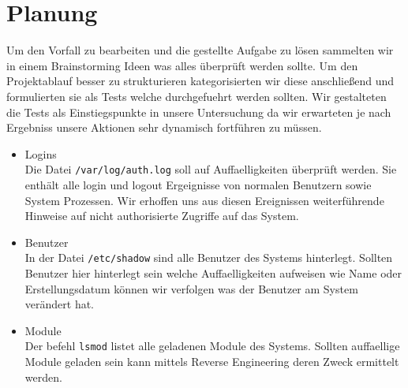 \section{Planung}
Um den Vorfall zu bearbeiten und die gestellte Aufgabe zu lösen sammelten wir in einem Brainstorming Ideen was alles überprüft werden sollte. Um den Projektablauf besser zu strukturieren kategorisierten wir diese anschließend und formulierten sie als Tests welche durchgefuehrt werden sollten. Wir gestalteten die Tests als Einstiegspunkte in unsere Untersuchung da wir erwarteten je nach Ergebniss unsere Aktionen sehr dynamisch fortführen zu müssen.

\begin{itemize}
\item Logins\\
Die Datei \texttt{/var/log/auth.log} soll auf Auffaelligkeiten überprüft werden. Sie enthält alle login und logout Ergeignisse von normalen Benutzern sowie System Prozessen. Wir erhoffen uns aus diesen Ereignissen weiterführende Hinweise auf nicht authorisierte Zugriffe auf das System.

\item Benutzer\\
In der Datei \texttt{/etc/shadow} sind alle Benutzer des Systems hinterlegt. Sollten Benutzer hier hinterlegt sein welche Auffaelligkeiten aufweisen wie Name oder Erstellungsdatum können wir verfolgen was der Benutzer am System verändert hat.

\item Module\\
Der befehl \texttt{lsmod} listet alle geladenen Module des Systems. Sollten auffaellige Module geladen sein kann mittels Reverse Engineering deren Zweck ermittelt werden.
\end{itemize}

